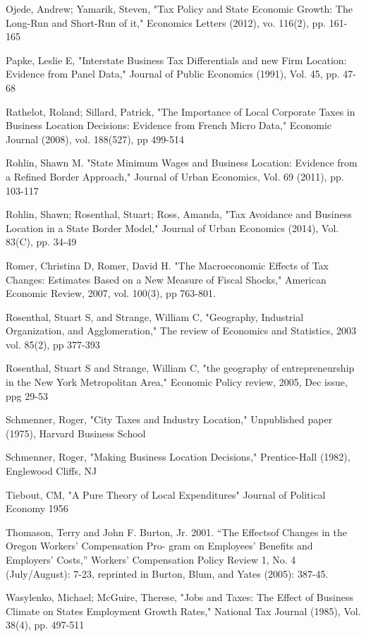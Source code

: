 \documentclass[12pt,a4paper]{article}
\begin{document}
\begin{thebibliography}{99}
Ojede, Andrew; Yamarik, Steven, "Tax Policy and State Economic Growth: The Long-Run and Short-Run of it," Economics Letters (2012), vo. 116(2), pp. 161-165

Papke, Leslie E, "Interstate Business Tax Differentials and new Firm Location: Evidence from Panel Data," Journal of Public Economics (1991), Vol. 45, pp. 47-68

Rathelot, Roland; Sillard, Patrick, "The Importance of Local Corporate Taxes in Business Location Decisions: Evidence from French Micro Data," Economic Journal (2008), vol. 188(527), pp 499-514

Rohlin, Shawn M. "State Minimum Wages and Business Location: Evidence from a Refined Border Approach," Journal of Urban Economics, Vol. 69 (2011), pp. 103-117

Rohlin, Shawn; Rosenthal, Stuart; Ross, Amanda, "Tax Avoidance and Business Location in a State Border Model," Journal of Urban Economics (2014), Vol. 83(C), pp. 34-49

Romer, Christina D, Romer, David H. "The Macroeconomic Effects of Tax Changes: Estimates Based on a New Measure of Fiscal Shocks," American Economic Review, 2007, vol. 100(3), pp 763-801.

Rosenthal, Stuart S, and Strange, William C, "Geography, Industrial Organization, and Agglomeration," The review of Economics and Statistics, 2003 vol. 85(2), pp 377-393

Rosenthal, Stuart S and Strange, William C, "the geography of entrepreneurship in the New York Metropolitan Area," Economic Policy review, 2005, Dec issue, ppg 29-53

Schmenner, Roger, "City Taxes and Industry Location," Unpublished paper (1975), Harvard Business School

Schmenner, Roger, "Making Business Location Decisions," Prentice-Hall (1982), Englewood Cliffs, NJ

Tiebout, CM, "A Pure Theory of Local Expenditures" Journal of Political Economy 1956

Thomason, Terry and John F. Burton, Jr. 2001. “The Effectsof Changes in the Oregon Workers’ Compensation Pro-
gram on Employees’ Benefits and Employers’ Costs,” Workers’ Compensation Policy Review 1, No. 4 (July/August): 7-23, reprinted in Burton, Blum, and Yates (2005): 387-45. 

Wasylenko, Michael; McGuire, Therese, "Jobs and Taxes: The Effect of Business Climate on States Employment Growth Rates," National Tax Journal (1985), Vol. 38(4), pp. 497-511
\end{thebibliography}
\end{document}
